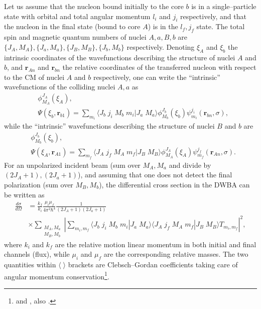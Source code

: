 Let us assume that the nucleon bound initially to the core $b$ is in a single--particle state with orbital and total angular momentum $l_i$ and  $j_i$ respectively, and that the nucleon in the final state (bound to core $A$)  is in the $l_f,j_f$ state. The total spin and magnetic quantum numbers of nuclei $A,a,B,b$ are $\{J_A,M_A\},\{J_a,M_a\},\{J_B,M_B\},\{J_b,M_b\}$ respectively. Denoting $\xi_A$ and $\xi_b$ the intrinsic coordinates of the wavefunctions describing the structure of nuclei $A$ and $b$, and $\mathbf{r}_{An}$ and $\mathbf{r}_{bn}$ the relative coordinates of the transferred nucleon with respect to the CM of nuclei $A$ and $b$ respectively, one can write the ``intrinsic''  wavefunctions of the colliding nuclei $A,a$ as 
\begin{equation}\label{eq_onept2}
    \begin{split}
    &\phi_{M_A}^{J_A}(\xi_A),\\
    &\Psi(\xi_b,\mathbf{r}_{b1})=\sum_{m_i}\langle J_b\;j_i\;M_b\;m_i|J_a\;M_a\rangle\phi_{M_b}^{J_b}(\xi_b)\psi_{m_i}^{j_i}(\mathbf{r}_{bn},\sigma),
    \end{split}
\end{equation}
while the ``intrinsic'' wavefunctions describing the structure of nuclei $B$ and $b$ are
\begin{equation}\label{eq_onept3}
    \begin{split}
    &\phi_{M_b}^{J_b}(\xi_b),\\
    &\Psi(\xi_A,\mathbf{r}_{A1})=\sum_{m_f}\langle J_A\;j_f\;M_A\;m_f|J_B\;M_B\rangle\phi_{M_A}^{J_A}(\xi_A)\psi_{m_f}^{j_f}(\mathbf{r}_{An},\sigma).
    \end{split}
\end{equation}
For an unpolarized incident beam (sum over $M_A,M_a$ and divide  by $(2J_A+1),(2J_a+1)$), and assuming that  one does not detect the final polarization (sum over $M_B,M_b$), the differential cross section in the DWBA can be written as
\begin{equation}\label{eq_onept4}
    \begin{split}
\frac{d\sigma}{d\Omega}&=\frac{k_f}{k_i}\frac{\mu_i\mu_f}{4\pi^2\hbar^4}\frac{1}{(2J_A+1)(2J_a+1)}\\
&\times\sum_{\substack{M_A,M_a\\M_B,M_b}}\left|\sum_{m_i,m_f}\langle J_b\;j_i\;M_b\;m_i|J_a\;M_a\rangle\langle J_A\;j_f\;M_A\;m_f|J_B\;M_B\rangle T_{m_i,m_f}\right|^2,
    \end{split}
\end{equation}
where $k_i$ and $k_f$ are the relative motion linear momentum in both initial and final channels (flux), while $\mu_i$ and $\mu_f$ are the corresponding relative masses. The two quantities within $\langle\;\rangle$ brackets are Clebsch--Gordan coefficients taking care of angular momentum conservation\footnote{\cite{Brink:68} and \cite{Edmonds:60}, also \cite{Bohr:69}.}.


